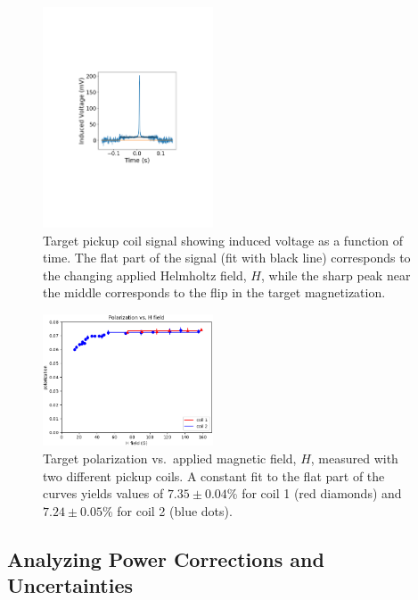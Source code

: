 \begin{figure}[ht]
 \begin{center}
  \includegraphics[width=0.45\textwidth]{11Vtgtdata.pdf}
 \end{center}
 \caption{Target pickup coil signal showing induced voltage as a function of time.  The flat part of the signal (fit with black line) corresponds 
 	to the changing applied Helmholtz field, $H$, while the sharp peak near the middle corresponds to the flip in the target magnetization.}
 \label{fig-TPolMeas}
\end{figure}

\begin{figure}[ht]
 \begin{center}
  \includegraphics[width=0.45\textwidth]{PvsH0.png}
 \end{center}
	\caption{Target polarization vs.~applied magnetic field, $H$, measured with two different pickup coils. A constant fit to the flat part 
	of the curves yields values of $7.35\pm 0.04$\% for coil 1 (red diamonds) and $7.24\pm 0.05$\% for coil 2 (blue dots).} 
 \label{fig-PSat}
\end{figure}

\subsection{Analyzing Power Corrections and Uncertainties}
\label{sec-PolCor}

